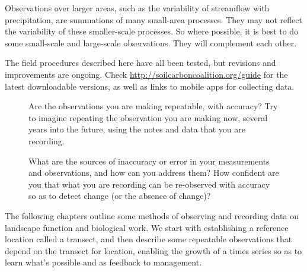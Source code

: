 \documentclass[11pt,letterpaper,twoside,onecolumn]{memoir}
\begin{document}
Observations over larger areas, such as the variability of streamflow with precipitation, are summations of many small-area processes. They may not reflect the variability of these smaller-scale processes. So where possible, it is best to do some small-scale and large-scale observations. They will complement each other.

The field procedures described here have all been tested, but revisions and improvements are ongoing. Check \url{http://soilcarboncoalition.org/guide} for the latest downloadable versions, as well as links to mobile apps for collecting data.

\begin{figure}
\begin{tcolorbox}
\setlength{\parskip}{.7em}
Are the observations you are making repeatable, with accuracy? Try to imagine repeating the observation you are making now, several years into the future, using the notes and data that you are recording. 

What are the sources of inaccuracy or error in your measurements and observations, and how can you address them? How confident are you that what you are recording can be re-observed with accuracy so as to detect change (or the absence of change)?

\end{tcolorbox}
\end{figure}

The following chapters outline some methods of observing and recording data on landscape function and biological work. We start with establishing a reference location called a transect, and then describe some repeatable observations that depend on the transect for location, enabling the growth of a times series so as to learn what's possible and as feedback to management.
\end{document}
